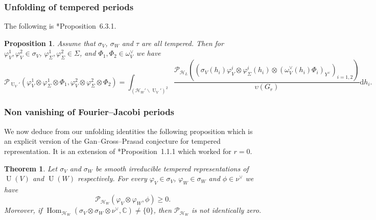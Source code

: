 \documentclass[letterpaper,11pt]{amsart}
\newcommand{\C}{\mathbb{C}}
\newcommand{\cH}{\mathcal{H}}
\newcommand{\cP}{\mathcal{P}}
\newcommand{\rd}{\mathrm{d}}
\newcommand{\<}{\negthickspace}
\DeclareMathOperator{\U}{U}
\DeclareMathOperator{\Hom}{Hom}
\theoremstyle{definition}
\theoremstyle{plain}
\newtheorem{theorem}[definition]{Theorem}
\newtheorem{prop}[definition]{Proposition}
\theoremstyle{remark}
\numberwithin{equation}{section}
\begin{document}
\subsubsection{Unfolding of tempered periods}

The following is \cite{Boi}*{Proposition~6.3.1}.
\begin{prop}
\label{prop:tempered_computations}
    Assume that $\sigma_V$, $\sigma_W$ and $\tau$ are all tempered. Then for $\varphi^1_V, \varphi^2_V \in \sigma_V$,  $\varphi^1_\Sigma, \varphi^2_\Sigma \in \Sigma$,  and $\Phi_1, \Phi_2 \in \omega^\vee_V$ we have
    \begin{equation}
        \mathcal{P}_{\U_V'}(\varphi^1_V \otimes \varphi^1_\Sigma \otimes \Phi_1, \varphi^2_V \otimes \varphi^2_\Sigma \otimes \Phi_2) \nonumber 
        =\int_{(\cH_W' \backslash \U_V')^2} \frac{\mathcal{P}_{\cH_L}\left(
        (\sigma_V(h_i) \varphi^i_V \otimes \varphi^i_\Sigma(h_i) \otimes (\omega^\vee_V(h_i) \Phi_i)_{Y^\vee})_{i=1,2}\right)}{\upsilon(G_r)} \rd h_i. \label{eq:to_prove_temp}
    \end{equation}
\end{prop}


\subsubsection{Non vanishing of Fourier--Jacobi periods}

We now deduce from our unfolding identities the following proposition which is an explicit version of the Gan--Gross--Prasad conjecture for tempered representation. It is an extension of \cite{Xue2}*{Proposition~1.1.1} which worked for $r=0$.

\begin{theorem}
    \label{thm:explicit_GGP_FJ}
    Let $\sigma_V$ and $\sigma_W$ be smooth irreducible tempered representations of $\U(V)$ and $\U(W)$ respectively. For every $\varphi_V \in \sigma_V$, $\varphi_W \in \sigma_W$ and $\phi \in \nu^\vee$ we have 
    \begin{equation*}
        \cP_{\cH_W}(\varphi_V \otimes \varphi_W , \phi) \geq 0.
    \end{equation*}
    Moreover, if $\Hom_{\cH_W}(\sigma_V \otimes \sigma_W \otimes \nu^\vee,\C) \neq \{0\}$, then $\cP_{\cH_W}$ is not identically zero.
\end{theorem}
\end{document}
